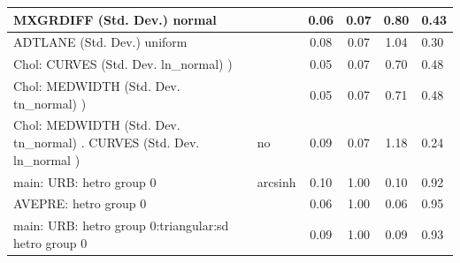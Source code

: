 \begin{table}
\begin{center}
\begin{tabular}{|l|l|c|c|c|l|}
			\hline
			MXGRDIFF (Std. Dev.) normal &  & 0.06 & 0.07 & 0.80 & 0.43 \\
			\hline
			ADTLANE (Std. Dev.) uniform &  & 0.08 & 0.07 & 1.04 & 0.30 \\
			\hline
			 Chol: CURVES (Std. Dev. ln_normal) ) &  & 0.05 & 0.07 & 0.70 & 0.48 \\
			\hline
			 Chol: MEDWIDTH (Std. Dev. tn_normal) ) &  & 0.05 & 0.07 & 0.71 & 0.48 \\
			\hline
			 Chol: MEDWIDTH (Std. Dev. tn_normal) . CURVES (Std. Dev.   ln_normal ) & no & 0.09 & 0.07 & 1.18 & 0.24 \\
			\hline
			main: URB: hetro group 0 & arcsinh & 0.10 & 1.00 & 0.10 & 0.92 \\
			\hline
			AVEPRE: hetro group 0 &  & 0.06 & 1.00 & 0.06 & 0.95 \\
			\hline
			main: URB: hetro group 0:triangular:sd  hetro group 0 &  & 0.09 & 1.00 & 0.09 & 0.93 \\
			\hline
		\end{tabular}
	\end{center}
\end{table}